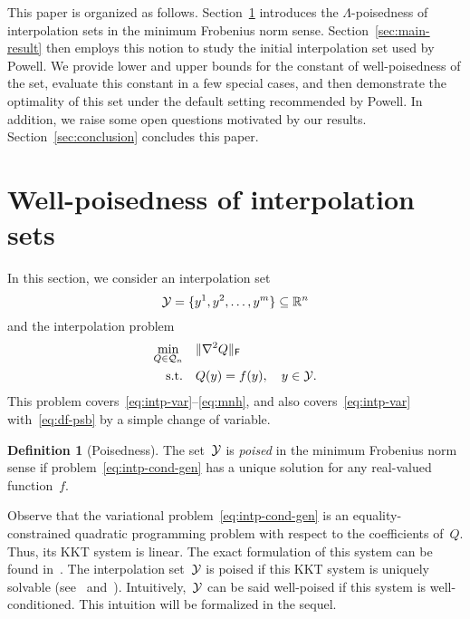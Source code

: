 \documentclass{article}
\makeatletter
\newcounter{cite}
\numberwithin{equation}{section}
\theoremstyle{definition}
\newtheorem{definition}{Definition}[section]
\theoremstyle{plain}
\theoremstyle{remark}
\newcommand*{\norm}[2][]{#1\lVert#2#1\rVert}
\newcommand*{\set}[2][]{#1\{#2#1\}}
\newcommand*{\obj}{f}
\newcommand*{\R}{\mathbb{R}}
\newcommand*{\xpt}[1][]{\mathcal{Y}\ifblank{#1}{}{^{@#1}}}
\newcommand*{\qpoly}{\mathcal{Q}_n}
\makeatother
\begin{document}
This paper is organized as follows.
Section~\ref{sec:well-poisedness} introduces the $\Lambda$-poisedness of interpolation sets in the minimum Frobenius norm sense.
Section~\ref{sec:main-result} then employs this notion to study the initial interpolation set used by Powell.
We provide lower and upper bounds for the constant of well-poisedness of the set, evaluate this constant in a few special cases, and then demonstrate the optimality of this set under the default setting recommended by Powell.
In addition, we raise some open questions motivated by our results.
Section~\ref{sec:conclusion} concludes this paper.

\section{Well-poisedness of interpolation sets}
\label{sec:well-poisedness}

In this section, we consider an interpolation set
\begin{equation*}
    \xpt = \set{y^1, y^2, \dots, y^m} \subseteq \R^n
\end{equation*}
and the interpolation problem
\begin{equation}
    \label{eq:intp-cond-gen}
    \begin{aligned}
        \min_{Q \in \qpoly} & \quad \norm{\nabla^2 Q}_\textsf{F}\\
        \text{s.t.}         & \quad Q(y) = \obj(y), \quad y \in \xpt.
    \end{aligned}
\end{equation}
This problem covers~\eqref{eq:intp-var}--\eqref{eq:mnh}, and also covers~\eqref{eq:intp-var} with~\eqref{eq:df-psb} by a simple change of variable.

\begin{definition}[Poisedness]
    The set~$\xpt$ is \emph{poised} in the minimum Frobenius norm sense if problem~\eqref{eq:intp-cond-gen} has a unique solution for any real-valued function~$\obj$.
\end{definition}

Observe that the variational problem~\eqref{eq:intp-cond-gen} is an equality-constrained quadratic programming problem with respect to the coefficients of~$Q$.
Thus, its KKT system is linear.
The exact formulation of this system can be found in~\cite{Powell_2004a,Powell_2004b}.
The interpolation set~$\xpt$ is poised if this KKT system is uniquely solvable (see~\cite[\S~2]{Powell_2004a} and~\cite[\S~5.3]{Conn_Scheinberg_Vicente_2009}).
Intuitively,~$\xpt$ can be said well-poised if this system is well-conditioned.
This intuition will be formalized in the sequel.
\end{document}
